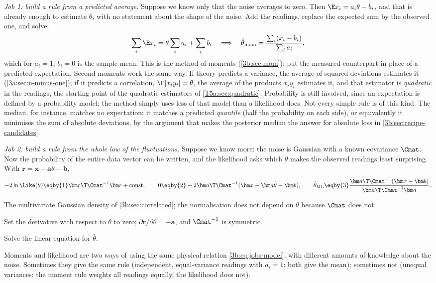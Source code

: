 \emph{Job 1: build a rule from a predicted average.} Suppose we know only that the noise averages to zero. Then $\E x_i=a_i\theta+b_i$, and that is already enough to estimate $\theta$, with no statement about the shape of the noise. Add the readings, replace the expected sum by the observed one, and solve:
\[
\sum_i\E x_i=\theta\sum_ia_i+\sum_ib_i
\quad\Longrightarrow\quad
\hat\theta_{\rm mom}=\frac{\sum_i(x_i-b_i)}{\sum_ia_i},
\]
which for $a_i=1$, $b_i=0$ is the sample mean. This is the method of moments (\cref{3b:sec:mom}): put the measured counterpart in place of a predicted expectation. Second moments work the same way. If theory predicts a variance, the average of squared deviations estimates it (\cref{3a:sec:n-minus-one}); if it predicts a correlation, $\E[x_iy_i]=\theta$, the average of the products $x_iy_i$ estimates it, and that estimator is \emph{quadratic} in the readings, the starting point of the quadratic estimators of \cref{T5a:sec:quadratic}. Probability is still involved, since an expectation is defined by a probability model; the method simply uses less of that model than a likelihood does. Not every simple rule is of this kind. The median, for instance, matches no expectation: it matches a predicted \emph{quantile} (half the probability on each side), or equivalently it minimises the sum of absolute deviations, by the argument that makes the posterior median the answer for absolute loss in \cref{3b:sec:recipe-candidates}.

\emph{Job 2: build a rule from the whole law of the fluctuations.} Suppose we know more: the noise is Gaussian with a known covariance $\Cmat$. Now the probability of the entire data vector can be written, and the likelihood asks which $\theta$ makes the observed readings least surprising. With $\bm r=\bm x-\bm a\theta-\bm b$,
\begin{equation}
-2\ln\Like(\theta)\eqby{1}\bm r\T\Cmat^{-1}\bm r+\text{const},\qquad
0\eqby{2}-2\bm a\T\Cmat^{-1}(\bm x-\bm a\hat\theta-\bm b),\qquad
\hat\theta_{\rm ML}\eqby{3}\frac{\bm a\T\Cmat^{-1}(\bm x-\bm b)}{\bm a\T\Cmat^{-1}\bm a}.
\label{3b:eq:jobs-ml}
\end{equation}
\begin{explain}
  \item The multivariate Gaussian density of \cref{3b:sec:correlated}; the normalisation does not depend on $\theta$ because $\Cmat$ does not.
  \item Set the derivative with respect to $\theta$ to zero; $\partial\bm r/\partial\theta=-\bm a$, and $\Cmat^{-1}$ is symmetric.
  \item Solve the linear equation for $\hat\theta$.
\end{explain}
Moments and likelihood are two ways of using the same physical relation \eqref{3b:eq:jobs-model}, with different amounts of knowledge about the noise. Sometimes they give the same rule (independent, equal-variance readings with $a_i=1$: both give the mean); sometimes not (unequal variances: the moment rule weights all readings equally, the likelihood does not).

